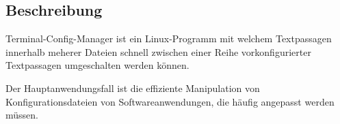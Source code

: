 \subsection{Beschreibung}
Terminal-Config-Manager ist ein Linux-Programm mit welchem
\gls{Textpassage}n innerhalb meherer Dateien schnell zwischen einer Reihe
vorkonfigurierter \gls{Textpassage}n umgeschalten werden können.

Der Hauptanwendungsfall ist die effiziente  Manipulation von
Konfigurationsdateien von Softwareanwendungen, die häufig angepasst
werden müssen.